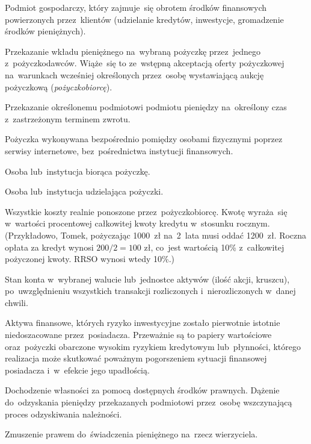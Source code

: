\documentclass[a4paper,twoside,titlepage,openright]{book}
\begin{document}
\begin{description}[style=nextline]
	\item[Instytucja finansowa] Podmiot gospodarczy, który zajmuje~się obrotem środków finansowych powierzonych przez~klientów (udzielanie kredytów, inwestycje, gromadzenie środków pieniężnych).
	\item[Oferta inwestycyjna] Przekazanie wkładu pieniężnego na~wybraną pożyczkę przez~jednego z~pożyczkodawców. Wiąże~się to ze~wstępną akceptacją oferty pożyczkowej na~warunkach wcześniej określonych przez~osobę wystawiającą aukcję pożyczkową (\textit{pożyczkobiorcę}).
	\item[Pożyczka] Przekazanie określonemu podmiotowi podmiotu pieniędzy na~określony czas z~zastrzeżonym terminem zwrotu. 
	\item[Pożyczka społecznościowa (ang. \textit{social lending})] Pożyczka wykonywana bezpośrednio pomiędzy osobami fizycznymi poprzez serwisy internetowe, bez~pośrednictwa instytucji finansowych.
	\item[Pożyczkobiorca] Osoba lub~instytucja biorąca pożyczkę.\cite{slownikPwn}
	\item[Pożyczkodawca] Osoba lub~instytucja udzielająca pożyczki.\cite{slownikPwn}
	\item[RRSO (Rzeczywista roczna stopa oprocentowania)] Wszystkie koszty realnie ponoszone przez~pożyczkobiorcę. Kwotę wyraża~się w~wartości procentowej całkowitej kwoty kredytu w~stosunku rocznym. (Przykładowo, Tomek, pożyczając 1000~zł na~2~lata musi oddać 1200~zł. Roczna opłata za kredyt wynosi $ 200 / 2 = 100 \text{ zł} $, co~jest wartością 10\% z~całkowitej pożyczonej kwoty. RRSO wynosi wtedy 10\%.)
	\item[Saldo] Stan konta w~wybranej walucie lub~jednostce aktywów (ilość akcji, kruszcu), po~uwzględnieniu wszystkich transakcji rozliczonych i~nierozliczonych w~danej chwili.
	\item[Toksyczne aktywa] Aktywa finansowe, których ryzyko inwestycyjne zostało pierwotnie istotnie niedoszacowane przez~posiadacza. Przeważnie są to papiery wartościowe oraz~pożyczki obarczone wysokim ryzykiem kredytowym lub~płynności, którego realizacja może skutkować poważnym pogorszeniem sytuacji finansowej posiadacza i~w~efekcie jego upadłością.\cite{slownikNBP}
	\item[Windykacja] Dochodzenie własności za pomocą dostępnych środków prawnych. Dążenie do~odzyskania pieniędzy przekazanych podmiotowi przez~osobę wszczynającą proces odzyskiwania należności.
	\item[Zobowiązania] Zmuszenie prawem do~świadczenia pieniężnego na~rzecz wierzyciela.
\end{description}
 
\end{document}
